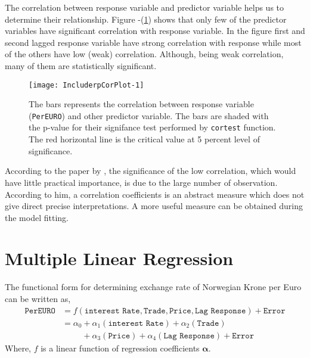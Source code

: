 \documentclass[12pt, lot, lof]{thesis}\usepackage[]{graphicx}\usepackage[]{color}
\makeatletter
\def\maxwidth{ %
  \ifdim\Gin@nat@width>\linewidth
    \linewidth
  \else
    \Gin@nat@width
  \fi
}
\newcommand{\bs}[1]{\ensuremath{\boldsymbol{#1}}}
\makeatother
\begin{document}
The correlation between response variable and predictor variable helps us to determine their relationship. Figure -(\ref{fig:rpCorPlot}) shows that only few of the predictor variables have significant correlation with response variable. In the figure first and second lagged response variable have strong correlation with response while most of the others have low (weak) correlation. Although, being weak correlation, many of them are statistically significant.
\begin{Schunk}
\begin{figure}

{\centering \texttt{[image: IncluderpCorPlot-1]} 

}

\caption[Correlation between response (Exchange Rate) and other predictor variable]{The bars represents the correlation between response variable (\texttt{PerEURO}) and other predictor variable. The bars are shaded with the p-value for their signifance test performed by \texttt{cortest} function. The red horizontal line is the critical value at 5 percent level of significance.\label{fig:rpCorPlot}}
\end{figure}
\end{Schunk}
According to the paper  by \citet{taylor1990interpretation}, the significance of the low correlation, which would have little practical importance, is due to the large number of observation. According to him, a correlation coefficients is an abstract measure which does not give direct precise interpretations. A more useful measure can be obtained during the model fitting.





\section{Multiple Linear Regression}
\label{sec:mlr}
The functional form for determining exchange rate of Norwegian Krone per Euro can be written as,
\begin{align}
\label{eq:mlrFuncForm}
\texttt{PerEURO}&=f(\texttt{interest Rate}, \texttt{Trade}, \texttt{Price}, \texttt{Lag Response})+\texttt{Error} \nonumber \\
&=\alpha_0 +\alpha_1(\texttt{interest Rate})+\alpha_2(\texttt{Trade}) \nonumber \\
&\hspace{1cm}+\alpha_3(\texttt{Price})+\alpha_4(\texttt{Lag Response})+\texttt{Error}
\end{align}
Where, $f$ is a linear function of regression coefficients \bs{\alpha}.
\end{document}

